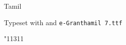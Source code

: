 \newfontfamily{}%

\begin{scriptexample}[\grantha]{Tamil}

\hfill  Typeset with \cmd{\grantha} and \texttt{e-Granthamil 7.ttf}
\end{scriptexample}

{
\grantha \char"11311

}

%
%
%
%


